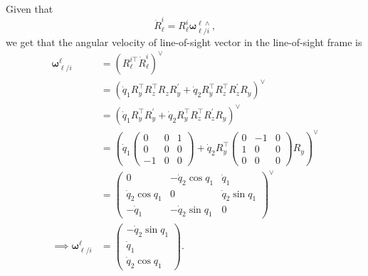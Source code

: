 \documentclass{article}
\newcommand{\omegabf}{\boldsymbol{\omega}}
\begin{document}
Given that
\[
\dot{R}_\ell^i = R_\ell^i \omegabf_{\ell/i}^{\ell \wedge}  ,
\]
we get that the angular velocity of line-of-sight vector in the line-of-sight frame is
\begin{align*}
	\omegabf_{\ell/i}^\ell &= (R_\ell^{i\top} \dot{R}_\ell^i )^\vee \\
	&= \left(\dot{q}_1 R_y^\top R_z^\top R_z R_y^{'} + \dot{q}_2 R_y^\top R_z^\top R_z^{'} R_y \right)^\vee \\
	&= \left(\dot{q}_1 R_y^\top R_y^{'} + \dot{q}_2 R_y^\top R_z^\top R_z^{'} R_y \right)^\vee \\
	&= \left(\dot{q}_1 \begin{pmatrix}0&0&1\\0&0&0\\-1&0&0\end{pmatrix} + \dot{q}_2 R_y^\top \begin{pmatrix}0&-1&0\\1&0&0\\0&0&0\end{pmatrix}R_y \right)^\vee \\
	&= \begin{pmatrix}
		0 & -\dot{q}_2\cos q_1 & \dot{q}_1 \\
		\dot{q}_2\cos q_1 & 0 & \dot{q}_2\sin q_1 \\
		-\dot{q}_1 & -\dot{q}_2\sin q_1 & 0
	   \end{pmatrix}^\vee \\
\implies \omegabf_{\ell/i}^\ell &= \begin{pmatrix} -\dot{q}_2\sin q_1 \\ \dot{q}_1 \\ \dot{q}_2\cos q_1 \end{pmatrix}.
\end{align*}
\end{document}
